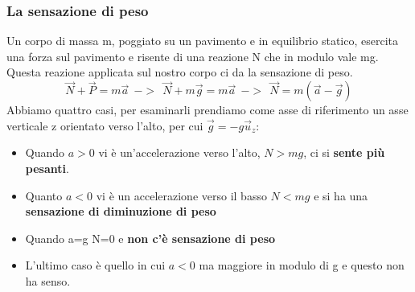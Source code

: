 \documentclass{article}
\numberwithin{equation}{subsection}
\begin{document}
\subsubsection{La sensazione di peso}
Un corpo di massa m, poggiato su un pavimento e in equilibrio statico, esercita una forza sul pavimento e risente di una reazione N che in modulo vale mg. Questa reazione applicata sul nostro corpo ci da la sensazione di peso.
\begin{equation}
    \vec{N}+\vec{P}=m\vec{a} \ \ -> \ \ \vec{N}+m\vec{g}=m\vec{a} \ \ -> \  \ \vec{N}=m(\vec{a}-\vec{g})
\end{equation}
Abbiamo quattro casi, per esaminarli prendiamo come asse di riferimento un asse verticale z orientato verso l'alto, per cui $\vec{g}=-g\vec{u}_z$:
\begin{itemize}
    \item Quando $a>0$ vi è un'accelerazione verso l'alto, $N>mg$, ci si \textbf{sente più pesanti}.
    \item Quanto $a<0$ vi è un accelerazione verso il basso $N<mg$ e si ha una \textbf{sensazione di diminuzione di peso}
    \item Quando a=g N=0 e \textbf{non c'è sensazione di peso}
    \item L'ultimo caso è quello in cui $a<0$ ma maggiore in modulo di g e questo non ha senso.
\end{itemize}
\end{document}
